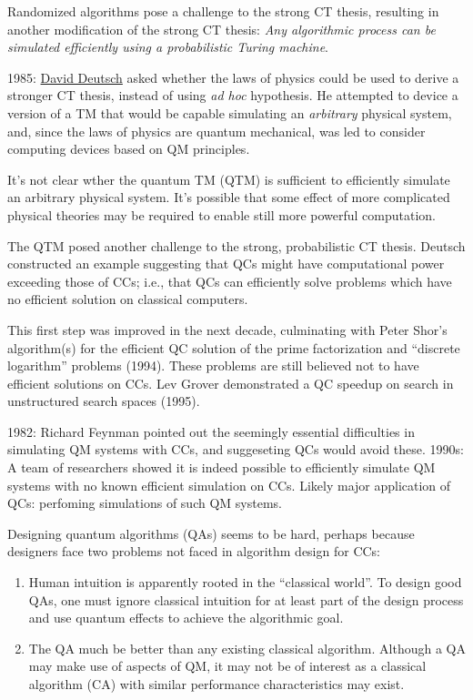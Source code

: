 \documentclass{article}
\begin{document}
Randomized algorithms pose a challenge to the strong CT thesis, resulting in another modification of the strong CT thesis: \textit{Any algorithmic process can be simulated efficiently using a probabilistic Turing machine}.

1985: \href{https://en.wikipedia.org/wiki/David_Deutsch}{David Deutsch} asked whether the laws of physics could be used to derive a stronger CT thesis, instead of using \textit{ad hoc} hypothesis. He attempted to device a version of a TM that would be capable simulating an \textit{arbitrary} physical system, and, since the laws of physics are quantum mechanical, was led to consider computing devices based on QM principles.

It's not clear wther the quantum TM (QTM) is sufficient to efficiently simulate an arbitrary physical system. It's possible that some effect of more complicated physical theories may be required to enable still more powerful computation.

The QTM posed another challenge to the strong, probabilistic CT thesis. Deutsch constructed an example suggesting that QCs might have computational power exceeding those of CCs; i.e., that QCs can efficiently solve problems which have no efficient solution on classical computers.

This first step was improved in the next decade, culminating with Peter Shor's algorithm(s) for the efficient QC solution of the prime factorization and ``discrete logarithm'' problems (1994). These problems are still believed not to have efficient solutions on CCs. Lev Grover demonstrated a QC speedup on search in unstructured search spaces (1995).

1982: Richard Feynman pointed out the seemingly essential difficulties in simulating QM systems with CCs, and suggeseting QCs would avoid these. 1990s: A team of researchers showed it is indeed possible to efficiently simulate QM systems with no known efficient simulation on CCs. Likely major application of QCs: perfoming simulations of such QM systems.

Designing quantum algorithms (QAs) seems to be hard, perhaps because designers face two problems not faced in algorithm design for CCs:

\begin{enumerate}
\item Human intuition is apparently rooted in the ``classical world''. To design good QAs, one must ignore classical intuition for at least part of the design process and use quantum effects to achieve the algorithmic goal.
\item The QA much be better than any existing classical algorithm. Although a QA may make use of aspects of QM, it may not be of interest as a classical algorithm (CA) with similar performance characteristics may exist.
\end{enumerate}
\end{document}
